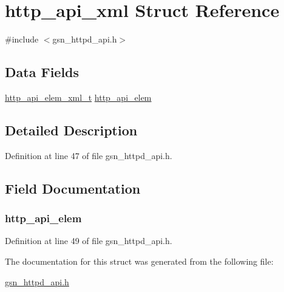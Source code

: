 \hypertarget{a00447}{
\section{http\_\-api\_\-xml Struct Reference}
\label{a00447}
}


{\ttfamily \#include $<$gsn\_\-httpd\_\-api.h$>$}

\subsection*{Data Fields}
\begin{DoxyCompactItemize}
\item 
\hyperlink{a00446}{http\_\-api\_\-elem\_\-xml\_\-t} \hyperlink{a00447_a5b1dd44f6814d4a74c8b8640fd7bd51b}{http\_\-api\_\-elem}
\end{DoxyCompactItemize}


\subsection{Detailed Description}


Definition at line 47 of file gsn\_\-httpd\_\-api.h.



\subsection{Field Documentation}
\hypertarget{a00447_a5b1dd44f6814d4a74c8b8640fd7bd51b}{
\subsubsection[{http\_\-api\_\-elem}]{ {\bf http\_\-api\_\-elem}}}
\label{a00447_a5b1dd44f6814d4a74c8b8640fd7bd51b}


Definition at line 49 of file gsn\_\-httpd\_\-api.h.



The documentation for this struct was generated from the following file:\begin{DoxyCompactItemize}
\item 
\hyperlink{a00509}{gsn\_\-httpd\_\-api.h}\end{DoxyCompactItemize}
